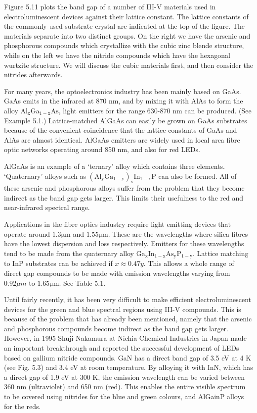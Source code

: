 \documentclass[12pt]{book}
\begin{document}
Figure 5.11 plots the band gap of a number of III-V materials used in electroluminescent devices against their lattice constant. The lattice constants of the commonly used substrate crystal are indicated at the top of the figure. The materials separate into two distinct groups. On the right we have the arsenic and phosphorous compounds which crystallize with the cubic zinc blende structure, while on the left we have the nitride compounds which have the hexagonal wurtzite structure. We will discuss the cubic materials first, and then consider the nitrides afterwards.

For many years, the optoelectronics industry has been mainly based on GaAs. GaAs emits in the infrared at 870 nm, and by mixing it with AlAs to form the alloy $\mathrm{Al_xGa_{1-x}As}$, light emitters for the range 630-870 nm can be produced. (See Example 5.1.) Lattice-matched AlGaAs can easily be grown on GaAs substrates because of the convenient coincidence that the lattice constants of GaAs and AlAs are almost identical. AlGaAs emitters are widely used in local area fibre optic networks operating around 850 nm, and also for red LEDs.

AlGaAs is an example of a `ternary' alloy which contains three elements. `Quaternary' alloys such as $\mathrm{(Al_yGa_{1-y})_xIn_{1-x}P}$ can also be formed. All of these arsenic and phosphorous alloys suffer from the problem that they become indirect as the band gap gets larger. This limits their usefulness to the red and near-infrared spectral range.

Applications in the fibre optics industry require light emitting devices that operate around $\mathrm{1.3\mu m}$ and $\mathrm{1.55\mu m}$. These are the wavelengths where silica fibres have the lowest dispersion and loss respectively. Emitters for these wavelengths tend to be made from the quaternary alloy $\mathrm{Ga_xIn_{1-x}As_yP_{1-y}}$. Lattice matching to InP substrates can be achieved if $x\approx 0.47y$. This allows a whole range of direct gap compounds to be made with emission wavelengths varying from $\mathrm{0.92} \mu m$ to $\mathrm{1.65\mu m}$. See Table 5.1.

Until fairly recently, it has been very difficult to make efficient electroluminescent devices for the green and blue spectral regions using III-V compounds. This is because of the problem that has already been mentioned, namely that the arsenic and phosphorous compounds become indirect as the band gap gets larger. However, in 1995 Shuji Nakamura at Nichia Chemical Industries in Japan made an important breakthrough and reported the successful development of LEDs based on gallium nitride compounds. GaN has a direct band gap of 3.5 eV at 4 K (see Fig. 5.3) and 3.4 eV at room temperature. By alloying it with InN, which has a direct gap of 1.9 eV at 300 K, the emission wavelength can be varied between 360 nm (ultraviolet) and 650 nm (red). This enables the entire visible spectrum to be covered using nitrides for the blue and green colours, and AlGainP alloys for the reds.
\end{document}
